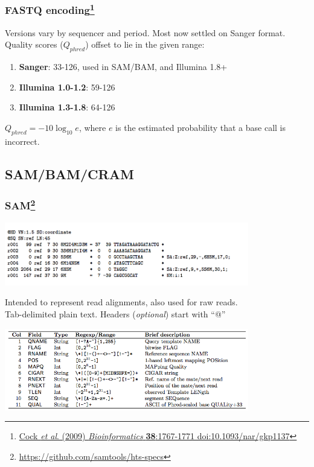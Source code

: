 \begin{frame}[fragile]
  \frametitle{FASTQ encoding\footnote{\tiny{\href{http://dx.doi.org/10.1093/nar/gkp1137}{Cock \textit{et al}. (2009) \textit{Bioinformatics} \textbf{38}:1767-1771 doi:10.1093/nar/gkp1137}}}}
  Versions vary by sequencer and period. Most now settled on Sanger format. \\
  Quality scores ($Q_{phred}$) offset to lie in the given range:
  \begin{enumerate}
    \item \textbf{Sanger}: 33-126, used in SAM/BAM, and Illumina 1.8+
    \item \textbf{Illumina 1.0-1.2}: 59-126
    \item \textbf{Illumina 1.3-1.8}: 64-126
  \end{enumerate}
  $Q_{phred} = -10 \log_{10}e$, where $e$ is the estimated probability that a base call is incorrect.
\end{frame}

\subsection{SAM/BAM/CRAM}

\begin{frame}[fragile]
  \frametitle{SAM\footnote{\tiny{\href{http://samtools.github.io/hts-specs/SAMv1.pdf}{https://github.com/samtools/hts-specs}}}}
  \begin{center}
    \includegraphics[width=0.8\textwidth]{images/sam_format}
  \end{center}  
  Intended to represent read alignments, also used for raw reads. \\
  Tab-delimited plain text. Headers (\textit{optional}) start with ``@'' \\
  \begin{center}
    \includegraphics[width=0.8\textwidth]{images/sam_columns}
  \end{center}  
\end{frame}


